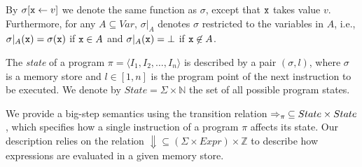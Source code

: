 \noindent By $\sigma[\text{${\tt x}$}\gets v]$ we denote the same function as $\sigma$, except that $\text{${\tt x}$}$ takes value $v$. Furthermore, for any $A\subseteq Var$, $\sigma\vert_{A}$ denotes $\sigma$ restricted to the variables in $A$, i.e., $\sigma\vert_{A}(\text{${\tt x}$})=\sigma(\texttt{x})$ if $\text{${\tt x}$}\in A$ and $\sigma\vert_{A}(\text{${\tt x}$})=\bot$ if $\text{${\tt x}$}\not\in A$. 

\begin{definition}
\label{de:prog-state}
The {\em state} of a program $\pi=\langle I_1, I_2, \ldots, I_n \rangle$ is described by a pair $(\sigma,l)$, where $\sigma$ is a memory store and $l\in [1,n]$ is the program point of the next instruction to be executed. We denote by $State=\Sigma\times \mathbb{N}$ the set of all possible program states.
\end{definition}

\noindent We provide a big-step semantics using the transition relation $\Rightarrow_{\pi}\:\subseteq State\times State$, which specifies how a single instruction of a program $\pi$ affects its state. Our description relies on the relation $\Downarrow\subseteq(\Sigma\times Expr)\times \mathbb{Z}$ to describe how expressions are evaluated in a given memory store.


